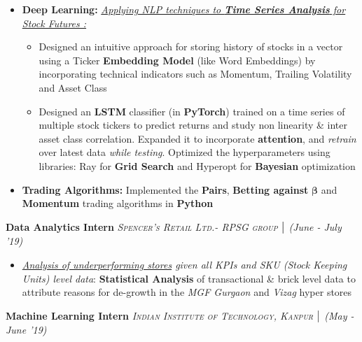\documentclass{article}
\begin{document}
\begin{itemize}[itemsep = -1 mm, leftmargin=*]
    \item \textbf{Deep Learning: }\underline{\it Applying NLP techniques to \textbf{Time Series Analysis} for Stock Futures :}
    \vspace{-7pt}
    \begin{itemize}[itemsep = -0.75 mm, leftmargin=*]
      \item Designed an intuitive approach for storing history of stocks in a vector using a Ticker \textbf{Embedding Model} (like Word Embeddings) by incorporating technical indicators such as Momentum, Trailing Volatility and Asset Class
     \item Designed an \textbf{LSTM} classifier (in \textbf{PyTorch}) trained on a time series of multiple stock tickers to predict returns and study non linearity \& inter asset class correlation. Expanded it to incorporate \textbf{attention}, and \textit{retrain} over latest data \textit{while testing}. Optimized the hyperparameters using libraries: Ray for \textbf{Grid Search} and Hyperopt for \textbf{Bayesian} optimization
    \end{itemize}
    \vspace{-4pt}
    \item \textbf{Trading Algorithms:} Implemented the \textbf{Pairs}, \textbf{Betting against} $\bm{\beta}$ and \textbf{Momentum} trading algorithms in \textbf{Python}
\end{itemize}
\vspace{-5pt}
\textbf{Data Analytics Intern} \hfill{\sl \small \textsc{Spencer's Retail Ltd.- RPSG group} $\bigm|$ (June - July '19)}\\
\vspace{-19pt}
\begin{itemize}[itemsep = -1 mm, leftmargin=*]
    \item {\it \underline {Analysis of underperforming stores} given all KPIs and SKU (Stock Keeping Units) level data}: {\bf Statistical Analysis} of transactional \& brick level data to attribute reasons for de-growth in the {\it MGF Gurgaon} and {\it Vizag} hyper stores
\end{itemize}
\vspace{-5pt}
\textbf{Machine Learning Intern} \hfill{\sl \small \textsc{Indian Institute of Technology, Kanpur} $\bigm|$ (May - June '19)}\\
\end{document}
